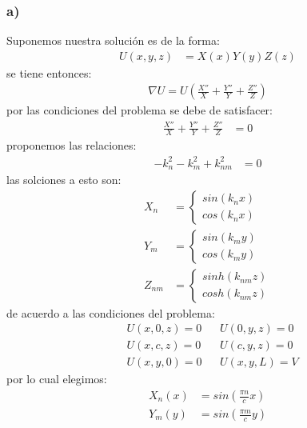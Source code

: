 \documentclass{article}
\begin{document}
\begin{tcolorbox}[breakable]
    \subsubsection*{a)}
    Suponemos nuestra solución es de la forma:
    \begin{align*}
        U(x,y,z) &= X(x)Y(y)Z(z)
    \end{align*}
    se tiene entonces:
    \begin{align*}
        \nabla U = U \left( \frac{X''}{X} + \frac{Y''}{Y} + \frac{Z''}{Z}  \right)
    \end{align*}
    por las condiciones del problema se debe de satisfacer:
    \begin{align*}
        \frac{X''}{X} + \frac{Y''}{Y} + \frac{Z''}{Z} &= 0
    \end{align*}
    proponemos las relaciones: 
    \begin{align*}
        -k_n^2 - k_m^2 + k_{nm}^2 &= 0
    \end{align*}
    las solciones a esto son:
    \begin{align*}
        X_n &= 
        \begin{cases}
            sin(k_nx) \\
            cos(k_nx) 
        \end{cases} \\
        Y_m &=
        \begin{cases}
            sin(k_my) \\ 
            cos(k_my)
        \end{cases} \\
        Z_{nm} &=
        \begin{cases}
            sinh(k_{nm}z) \\
            cosh(k_{nm}z)
        \end{cases} 
    \end{align*}
    de acuerdo a las condiciones del problema:
    \begin{align*}
        &U(x,0,z) = 0 &&U(0,y,z) = 0 \\
        &U(x,c,z) = 0 &&U(c,y,z) = 0 \\ 
        &U(x,y,0) = 0 &&U(x,y,L) = V
    \end{align*}
    por lo cual elegimos:
    \begin{align*}
        X_n(x) &= sin\left( \frac{\pi n}{c} x\right) \\
        Y_m(y) &= sin\left( \frac{\pi m}{c} y\right) \\

\end{align*}
\end{tcolorbox}
\end{document}
